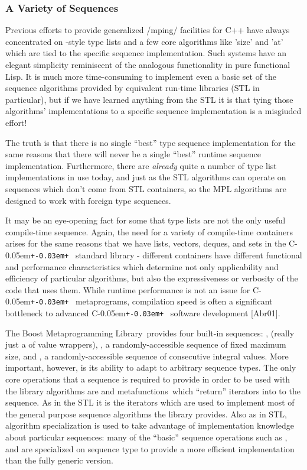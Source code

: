 \documentclass{netobjectdays}
\newcommand{\Cpp}{C\kern-0.05em\texttt{+\kern-0.03em+}%
}
\newcommand{\Mpl}{Boost Meta\-program\-ming Library}
\newcommand{\mfns}{meta\-functions}
\begin{document}
 
  \subsubsection{A Variety of Sequences}

Previous efforts to provide generalized /mping/ facilities for C++
have always concentrated on -style type lists and a few
core algorithms like 'size' and 'at' which are tied to the specific
sequence implementation. Such systems have an elegant simplicity
reminiscent of the analogous functionality in pure functional Lisp. It
is much more time-consuming to implement even a basic set of the
sequence algorithms provided by equivalent run-time libraries (STL in
particular), but if we have learned anything from the STL it is that
tying those algorithms' implementations to a specific sequence
implementation is a misgiuded effort!

The truth is that there is no single ``best'' type sequence
implementation for the same reasons that there will never be a single
``best'' runtime sequence implementation. Furthermore, there are
\emph{already} quite a number of type list implementations in use
today, and just as the STL algorithms can operate on sequences which
don't come from STL containers, so the MPL algorithms are designed to
work with foreign type sequences.

It may be an eye-opening fact for some that type lists are not the
only useful compile-time sequence. Again, the need for a variety of
compile-time containers arises for the same reasons that we have
lists, vectors, deques, and sets in the \Cpp\ standard library -
different containers have different functional and performance
characteristics which determine not only applicability and efficiency
of particular algorithms, but also the expressiveness or verbosity of
the code that uses them. While runtime performance is not an issue for
\Cpp\ metaprograms, compilation speed is often a significant
bottleneck to advanced \Cpp\ software development [Abr01].

The \Mpl\ provides four built-in sequences: ,
 (really just a  of value
wrappers), , a randomly-accessible sequence of
fixed maximum size, and , a randomly-accessible
sequence of consecutive integral values. More important, however, is
its ability to adapt to arbitrary sequence types. The only core
operations that a sequence is required to provide in order to be used
with the library algorithms are  and  \mfns\
which ``return'' iterators into to the sequence. As in the STL it is
the iterators which are used to implement most of the general purpose
sequence algorithms the library provides. Also as in STL, algorithm
specialization is used to take advantage of implementation knowledge
about particular sequences: many of the ``basic'' sequence operations
such as \code{back<>}, \code{front<>} \code{size<>} and \code{at<>}
are specialized on sequence type to provide a more efficient
implementation than the fully generic version.
\end{document}
